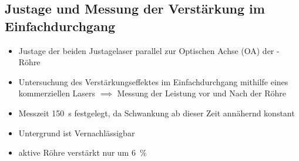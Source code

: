 \documentclass[10pt, aspectratio=169]{beamer}
\newcommand{\hne}{\ce{HeNe}}
\begin{document}
\subsection{Justage und Messung der Verst\"arkung im Einfachdurchgang}
\begin{frame}
  \begin{itemize}
  \item<1-> Justage der beiden Justagelaser parallel zur Optischen
    Achse (OA) der \hne{}-R\"ohre 
  \item<2-> Untersuchung des Verst\"arkungseffektes im
    Einfachdurchgang mithilfe eines kommerziellen \hne{} Lasers
    \(\implies\) Messung der Leistung vor und Nach der R\"ohre
  \item<3-> Messzeit \SI{150}{\second} festgelegt, da Schwankung ab
    dieser Zeit annähernd konstant
  \end{itemize}

  \begin{itemize}
  \item<5-> Untergrund ist Vernachl\"assigbar
  \item<6-> aktive R\"ohre verst\"arkt nur um \SI{6}{\percent}
  \end{itemize}
\end{frame}
\end{document}
